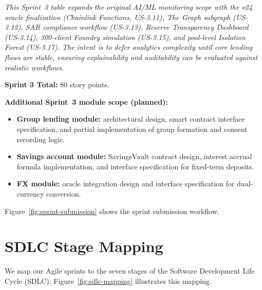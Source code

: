 \documentclass[12pt,a4paper]{report}
\begin{document}
\vspace{2pt}
\noindent\textit{\small This Sprint~3 table expands the original AI/ML monitoring scope with the v24 oracle finalization (Chainlink Functions, US-3.11), The Graph subgraph (US-3.12), SAR compliance workflow (US-3.13), Reserve Transparency Dashboard (US-3.14), 300-client Foundry simulation (US-3.15), and pool-level Isolation Forest (US-3.17). The intent is to defer analytics complexity until core lending flows are stable, ensuring explainability and auditability can be evaluated against realistic workflows.}

\noindent\textbf{Sprint 3 Total:} 80 story points.

\vspace{4pt}
\noindent\textbf{Additional Sprint~3 module scope (planned):}
\begin{itemize}[noitemsep]
\item \textbf{Group lending module:} architectural design, smart contract interface specification, and partial implementation of group formation and consent recording logic.
\item \textbf{Savings account module:} SavingsVault contract design, interest accrual formula implementation, and interface specification for fixed-term deposits.
\item \textbf{FX module:} oracle integration design and interface specification for dual-currency conversion.
\end{itemize}

Figure~\ref{fig:sprint-submission} shows the sprint submission workflow.



\section{SDLC Stage Mapping}

We map our Agile sprints to the seven stages of the Software Development Life Cycle (SDLC). Figure~\ref{fig:sdlc-mapping} illustrates this mapping.
\end{document}

